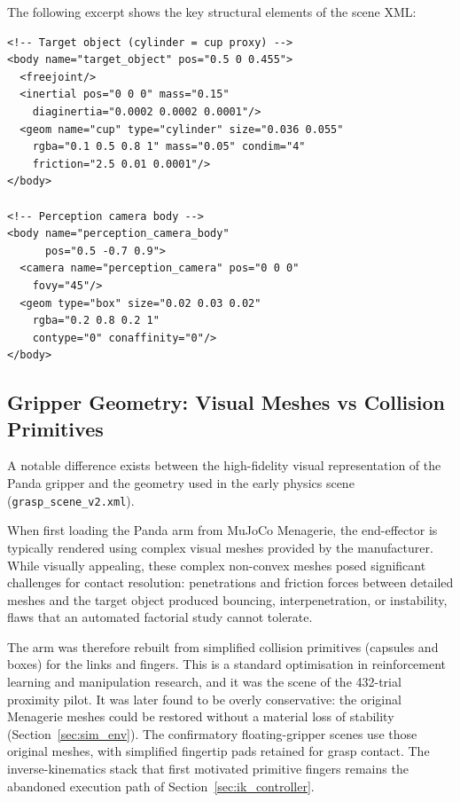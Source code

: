 \documentclass[11pt,a4paper]{report}
\begin{document}
The following excerpt shows the key structural elements of the scene XML:

\begin{lstlisting}[style=xml,caption={Excerpt from \texttt{grasp\_scene\_v2.xml} showing the target object and perception camera.},label={lst:scene_xml}]
<!-- Target object (cylinder = cup proxy) -->
<body name="target_object" pos="0.5 0 0.455">
  <freejoint/>
  <inertial pos="0 0 0" mass="0.15"
    diaginertia="0.0002 0.0002 0.0001"/>
  <geom name="cup" type="cylinder" size="0.036 0.055"
    rgba="0.1 0.5 0.8 1" mass="0.05" condim="4"
    friction="2.5 0.01 0.0001"/>
</body>

<!-- Perception camera body -->
<body name="perception_camera_body"
      pos="0.5 -0.7 0.9">
  <camera name="perception_camera" pos="0 0 0"
    fovy="45"/>
  <geom type="box" size="0.02 0.03 0.02"
    rgba="0.2 0.8 0.2 1"
    contype="0" conaffinity="0"/>
</body>
\end{lstlisting}

\subsection{Gripper Geometry: Visual Meshes vs Collision Primitives}
\label{sec:gripper_geometry}

A notable difference exists between the high-fidelity visual representation of the Panda gripper and the geometry used in the early physics scene (\texttt{grasp\_scene\_v2.xml}).

When first loading the Panda arm from MuJoCo Menagerie, the end-effector is typically rendered using complex visual meshes provided by the manufacturer. While visually appealing, these complex non-convex meshes posed significant challenges for contact resolution: penetrations and friction forces between detailed meshes and the target object produced bouncing, interpenetration, or instability, flaws that an automated factorial study cannot tolerate.

The arm was therefore rebuilt from simplified collision primitives (capsules and boxes) for the links and fingers. This is a standard optimisation in reinforcement learning and manipulation research, and it was the scene of the 432-trial proximity pilot. It was later found to be overly conservative: the original Menagerie meshes could be restored without a material loss of stability (Section~\ref{sec:sim_env}). The confirmatory floating-gripper scenes use those original meshes, with simplified fingertip pads retained for grasp contact. The inverse-kinematics stack that first motivated primitive fingers remains the abandoned execution path of Section~\ref{sec:ik_controller}.
\end{document}
